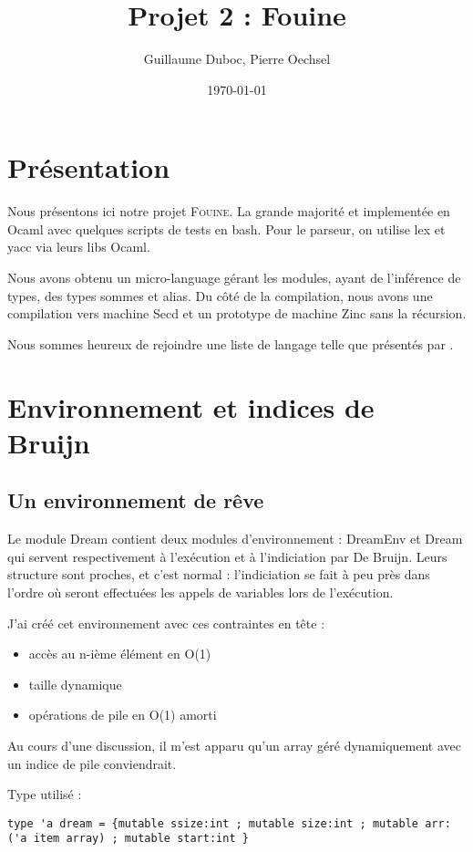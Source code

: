 \documentclass[paper=a4, fontsize=11pt, twocolumn]{article}
\title{Projet 2 : Fouine}
\author{Guillaume Duboc, Pierre Oechsel}
\date{\today}
\begin{document}
\maketitle


\section{Présentation}
Nous présentons ici notre projet \textsc{Fouine}. La grande majorité et implementée en Ocaml avec quelques scripts de tests en bash.
Pour le parseur, on utilise lex et yacc via leurs libs Ocaml.

Nous avons obtenu un micro-language gérant les modules, ayant de l'inférence de types, des types sommes et alias. Du côté de la compilation, nous avons une compilation vers machine Secd et un prototype de machine Zinc sans la récursion.


Nous sommes heureux de rejoindre une liste de langage telle que présentés par \cite{Landin}.


\section{Environnement et indices de Bruijn}
\subsection{Un environnement de rêve}

Le module Dream contient deux modules d'environnement : DreamEnv et Dream qui servent respectivement à l'exécution et à l'indiciation par De Bruijn. Leurs structure sont proches, et c'est normal : l'indiciation se fait à peu près dans l'ordre où seront effectuées les appels de variables lors de l'exécution.

J'ai créé cet environnement avec ces contraintes en tête :
\begin{itemize}
	\item accès au n-ième élément en O(1) 
	\item taille dynamique
	\item opérations de pile en O(1) amorti
\end{itemize}

Au cours d'une discussion, il m'est apparu qu'un array géré dynamiquement avec un indice de pile conviendrait.

Type utilisé :
\begin{verbatim}
type 'a dream = {mutable ssize:int ; mutable size:int ; mutable arr:('a item array) ; mutable start:int }
\end{verbatim}
\end{document}
